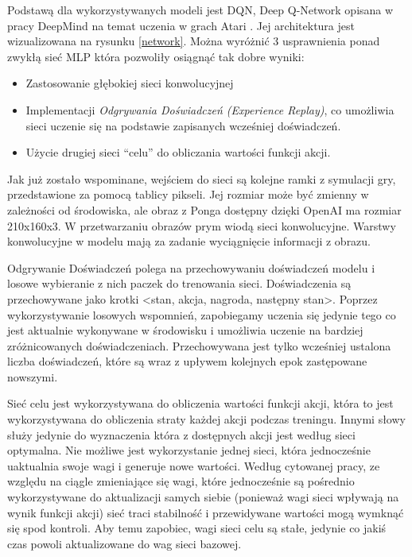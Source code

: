 \documentclass[preprint,12pt]{elsarticle}
\begin{document}
Podstawą dla wykorzystywanych modeli jest DQN, Deep Q-Network opisana w pracy DeepMind na temat uczenia w grach Atari \cite{DeepMind:2015}. Jej architektura jest wizualizowana na rysunku \ref{network}. Można wyróżnić 3 usprawnienia ponad zwykłą sieć MLP która pozwoliły osiągnąć tak dobre wyniki:

\begin{itemize}
\item {Zastosowanie głębokiej sieci konwolucyjnej}
\item {Implementacji \textit{Odgrywania Doświadczeń (Experience Replay)}, co umożliwia sieci uczenie się na podstawie zapisanych wcześniej doświadczeń.}
\item {Użycie drugiej sieci ``celu'' do obliczania wartości funkcji akcji.}
\end{itemize}

Jak już zostało wspominane, wejściem do sieci są kolejne ramki z symulacji gry, przedstawione za pomocą tablicy pikseli. Jej rozmiar może być zmienny w zależności od środowiska, ale obraz z Ponga dostępny dzięki OpenAI ma rozmiar 210x160x3. W przetwarzaniu obrazów prym wiodą sieci konwolucyjne. Warstwy konwolucyjne w modelu mają za zadanie wyciągnięcie informacji z obrazu. 

Odgrywanie Doświadczeń polega na przechowywaniu doświadczeń modelu i losowe wybieranie z nich paczek do trenowania sieci. Doświadczenia są przechowywane jako krotki \textless stan, akcja, nagroda, następny stan\textgreater. Poprzez wykorzystywanie losowych wspomnień, zapobiegamy uczenia się jedynie tego co jest aktualnie wykonywane w środowisku i umożliwia uczenie na bardziej zróżnicowanych doświadczeniach. Przechowywana jest tylko wcześniej ustalona liczba doświadczeń, które są wraz z upływem kolejnych epok zastępowane nowszymi.

Sieć celu jest wykorzystywana do obliczenia wartości funkcji akcji, która to jest wykorzystywana do obliczenia straty każdej akcji podczas treningu. Innymi słowy służy jedynie do wyznaczenia która z dostępnych akcji jest według sieci optymalna. Nie możliwe jest wykorzystanie jednej sieci, która jednocześnie uaktualnia swoje wagi i generuje nowe wartości. Według cytowanej pracy, ze względu na ciągle zmieniające się wagi, które jednocześnie są pośrednio wykorzystywane do aktualizacji samych siebie (ponieważ wagi sieci wpływają na wynik funkcji akcji) sieć traci stabilność i przewidywane wartości mogą wymknąć się spod kontroli. Aby temu zapobiec, wagi sieci celu są stałe, jedynie co jakiś czas powoli aktualizowane do wag sieci bazowej.
\end{document}
